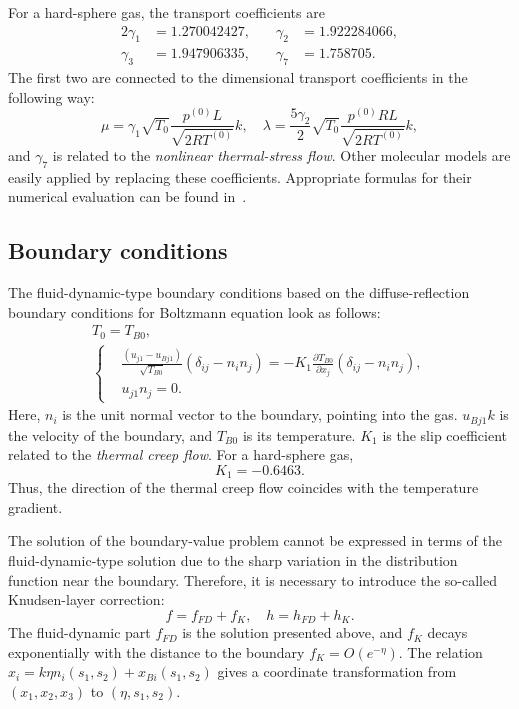 \documentclass[smallextended]{svjour3} %
\newcommand{\pder}[2][]{\frac{\partial#1}{\partial#2}}
\begin{document}
For a hard-sphere gas, the transport coefficients are
\begin{alignat*}{2}
    \gamma_1 &= 1.270042427, &\quad \gamma_2 &= 1.922284066, \\
    \gamma_3 &= 1.947906335, &\quad \gamma_7 &= 1.758705.
\end{alignat*}
The first two are connected to the dimensional transport coefficients in the following way:
\begin{equation}
    \mu = \gamma_1\sqrt{T_0} \frac{p^{(0)}L}{\sqrt{2RT^{(0)}}} k, \quad
    \lambda = \frac{5\gamma_2}{2}\sqrt{T_0} \frac{p^{(0)}RL}{\sqrt{2RT^{(0)}}} k,
\end{equation}
and \(\gamma_7\) is related to the \emph{nonlinear thermal-stress flow}.
Other molecular models are easily applied by replacing these coefficients.
Appropriate formulas for their numerical evaluation can be found in~\cite{SoneBobylev96, Sone2002, Sone2007}.

\subsection{Boundary conditions}

The fluid-dynamic-type boundary conditions based on the diffuse-reflection boundary conditions
for Boltzmann equation look as follows:
\begin{gather}
    T_0 = T_{B0}, \label{eq:bound:T} \\
    \left\{
    \begin{aligned}
        & \frac{(u_{j1}-u_{Bj1})}{\sqrt{T_{B0}}}(\delta_{ij}-n_in_j) =
            -K_1\pder[T_{B0}]{x_j}(\delta_{ij}-n_in_j), \\
        & u_{j1}n_j = 0.
    \end{aligned}
    \right. \label{eq:bound:v}
\end{gather}
Here, \(n_i\) is the unit normal vector to the boundary, pointing into the gas.
\(u_{Bj1}k\) is the velocity of the boundary, and \(T_{B0}\) is its temperature.
\(K_1\) is the slip coefficient related to the \emph{thermal creep flow}.
For a hard-sphere gas, \[ K_1 = -0.6463. \]
Thus, the direction of the thermal creep flow coincides with the temperature gradient.

The solution of the boundary-value problem cannot be expressed in terms of the fluid-dynamic-type
solution due to the sharp variation in the distribution function near the boundary.
Therefore, it is necessary to introduce the so-called Knudsen-layer correction:
\begin{equation}
    f = f_{FD} + f_K, \quad h = h_{FD} + h_K.
\end{equation}
The fluid-dynamic part \(f_{FD}\) is the solution presented above,
and \(f_K\) decays exponentially with the distance to the boundary \(f_K = O\left(e^{-\eta}\right)\).
The relation \( x_i = k\eta n_i(s_1,s_2) + x_{Bi}(s_1, s_2) \) gives a coordinate transformation
from \((x_1,x_2,x_3)\) to \((\eta,s_1,s_2)\).
\end{document}
